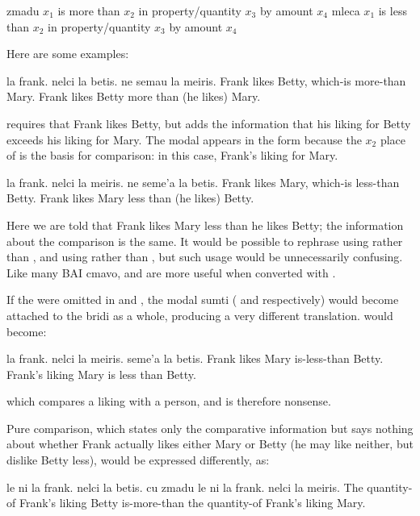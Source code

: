    zmadu   $x_1$ is more than $x_2$ in property/quantity $x_3$
            by amount $x_4$
    mleca   $x_1$ is less than $x_2$ in property/quantity $x_3$
            by amount $x_4$

Here are some examples:
\begin{example}
la frank. nelci la betis. ne semau la meiris.\n
Frank likes Betty, which-is more-than Mary.\n
Frank likes Betty more than (he likes) Mary.
\end{example}

 requires that Frank likes
    Betty, but adds the information that his liking for Betty
    exceeds his liking for Mary. The modal appears in the form
     because the $x_2$ place of  is the basis for
    comparison: in this case, Frank's liking for Mary.
\begin{example}
la frank. nelci la meiris. ne seme'a la betis.\n
Frank likes Mary, which-is less-than Betty.\n
Frank likes Mary less than (he likes) Betty.
\end{example}

Here we are told that Frank likes Mary less than he likes
    Betty; the information about the comparison is the same. It
    would be possible to rephrase 
    using  rather than , and  using  rather than
    , but such usage would be unnecessarily confusing.
    Like many BAI cmavo,  and  are more useful when
    converted with . 

If the  were omitted in  and , the modal sumti
    ( and  respectively) would become
    attached to the bridi as a whole, producing a very different
    translation.  would
    become:
\begin{example}
la frank. nelci la meiris. seme'a la betis.\n
Frank likes Mary is-less-than Betty.\n
Frank's liking Mary is less than Betty.
\end{example}

{\noindent}which compares a liking with a person, and is therefore
    nonsense. 

Pure comparison, which states only the comparative
    information but says nothing about whether Frank actually likes
    either Mary or Betty (he may like neither, but dislike Betty
    less), would be expressed differently, as:
\begin{example}
le ni la frank. nelci la betis.\n
\T	cu zmadu le ni la frank. nelci la meiris.\n
The quantity-of Frank's liking Betty\n
\T	is-more-than the quantity-of Frank's liking Mary.
\end{example}


